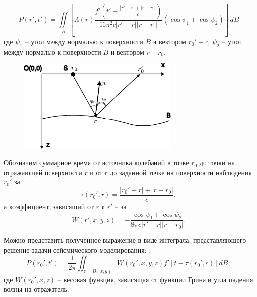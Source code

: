 \documentclass[a4paper, fontsize=14pt]{article}
\begin{document}
	

	\begin{equation}
		P(r',t') = \iint\limits_{B} \left[\Lambda(r) \frac{f'\left(t'-\frac{|r'-r|+|r-r_0|}{c}\right) }{16\pi^2c|r'-r||r-r_0|} (\cos \psi_1 + \cos \psi_2) \right] \,dB
		\label{eq:modapx}
	\end{equation}
где $\psi_1$ -- угол между нормалью к поверхности $B$ и вектором $r_0'-r$,
$\psi_2$ -- угол между нормалью к поверхности $B$ и вектором $r-r_0$. 

\begin{figure}[h]
	\centering
	\includegraphics[width=0.7\textwidth]{model_fig.pdf}
	\caption{}
	\label{fig:model}
\end{figure}
Обозначим суммарное время от источника колебаний в точке $r_0$ до точки на отражающей поверхности $r$ и от $r$ до заданной точке на поверхности наблюдения $r_0'$ за $$\tau(r_0',r) =\frac{|r_0'-r|+|r-r_0|}{c},$$ а коэффициент, зависящий от $r$ и $r'$ -- за 
$$
	W(r',x,y,z) = - \frac{\cos \psi_1 + \cos \psi_2}{8\pi c|r'-r||r-r_0|}.
$$ 



Можно представить полученное выражение в виде интеграла, представляющего решение задачи сейсмического моделирования: \cite{pokr}:
\begin{equation}
	P(r_0',t') = \frac{1}{2\pi} \iint_{z=B(x,y)} W(r_0',x,y,z) f'[t-\tau(r_0',r)] dB,
	\label{eq:modpokr}
\end{equation}
где $W(r_0',x,z)$ -- весовая функция, зависящая от функции Грина и угла падения волны на отражатель.
\end{document}
